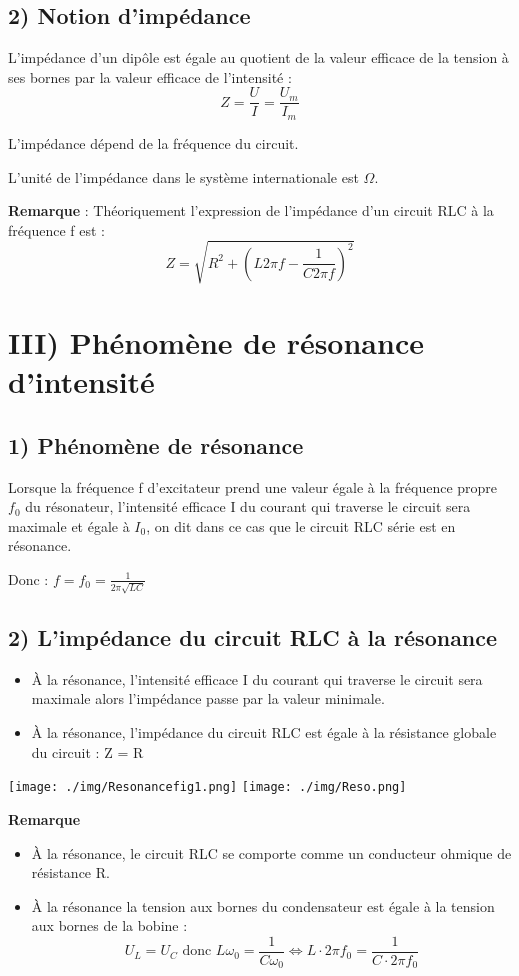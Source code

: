 \documentclass[12pt]{article}
\begin{document}
\subsection*{2) Notion d'impédance}
L'impédance d'un dipôle est égale au quotient de la valeur efficace de la tension à ses bornes par la valeur efficace de l'intensité : 
\[ Z = \frac{U}{I} = \frac{U_m}{I_m} \]

L'impédance dépend de la fréquence du circuit.

L'unité de l'impédance dans le système internationale est $\Omega$.

\textbf{Remarque} : Théoriquement l'expression de l'impédance d'un circuit RLC à la fréquence f est :
\[ Z = \sqrt{R^2 + (L2\pi f - \frac{1}{C2\pi f})^2} \]

\section*{III) Phénomène de résonance d'intensité}

\subsection*{1) Phénomène de résonance}
Lorsque la fréquence f d'excitateur prend une valeur égale à la fréquence propre $f_0$ du résonateur, l'intensité efficace I du courant qui traverse le circuit sera maximale et égale à $I_0$, on dit dans ce cas que le circuit RLC série est en résonance.

Donc : $f = f_0 = \frac{1}{2\pi\sqrt{LC}}$

\subsection*{2) L'impédance du circuit RLC à la résonance}
\begin{itemize}
\item À la résonance, l'intensité efficace I du courant qui traverse le circuit sera maximale alors l'impédance passe par la valeur minimale.
\item À la résonance, l'impédance du circuit RLC est égale à la résistance globale du circuit : Z = R
\end{itemize}
  \begin{center}
    \texttt{[image: ./img/Resonancefig1.png]}
    \texttt{[image: ./img/Reso.png]}
  \end{center}


\textbf{Remarque}
\begin{itemize}
\item À la résonance, le circuit RLC se comporte comme un conducteur ohmique de résistance R.
\item À la résonance la tension aux bornes du condensateur est égale à la tension aux bornes de la bobine :
\[ U_L = U_C \text{ donc } L\omega_0 = \frac{1}{C\omega_0} \Leftrightarrow L\cdot2\pi f_0 = \frac{1}{C\cdot2\pi f_0} \]
\end{itemize}
\end{document}
